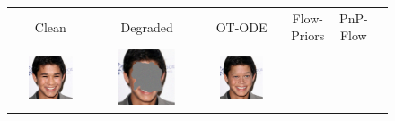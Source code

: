 \documentclass{article} %
\theoremstyle{definition}
\begin{document}
\begin{figure}[htp]
    \centering
    \begin{adjustbox}{max width=1.0\textwidth}
    \begin{tabular}{cccccc}
    \Huge Clean & \Huge Degraded & \Huge OT-ODE  & \Huge Flow-Priors &  \Huge PnP-Flow \\
\includegraphics[width=0.6\textwidth]{figures/celebahq/paintbrush_inpainting_clean_batch2_im0.pdf} & 
\includegraphics[width=0.6\textwidth]{figures/celebahq/paintbrush_inpainting_noisy_batch2_im0_pnsr19.03.pdf} &
\includegraphics[width=0.6\textwidth]{figures/celebahq/paintbrush_inpainting_ot_ode_batch2_im0_iterfinal_pnsr25.25.pdf} & 

\end{tabular}
\end{adjustbox}
\end{figure}
\end{document}
